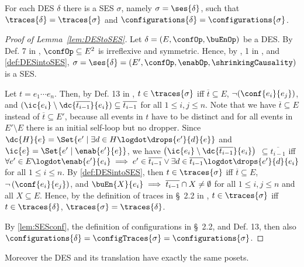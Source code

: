 \documentclass[runningheads,a4paper]{llncs}
\begin{document}
\begin{lemma}
	\label{lem:DEStoSES}
	For each DES $ \delta $ there is a SES $ \sigma $, namely $ \sigma = \ses{\delta} $, such that $ \traces{\delta} = \traces{\sigma} $ and $ \configurations{\delta} = \configurations{\sigma} $.
\end{lemma}

\begin{proof}[Proof of Lemma~\ref{lem:DEStoSES}]
	Let $ \delta = \left( E, \confOp, \buEnOp \right) $ be a DES. By Def. 7 in \cite{dynamicCausality15}, $ \confOp \subseteq E^2 $ is irreflexive and symmetric. Hence, by , 1 in \cite{dynamicCausality15}, and \ref{def:DESintoSES}, $ \sigma = \ses{\delta} = \left( E', \confOp, \enabOp, \shrinkingCausality \right) $ is a SES.	
	
	Let $ t = e_1 \cdots e_n $.	Then, by Def. 13 in \cite{dynamicCausality15}, $ t \in \traces{\sigma} $ iff $ \overline{t} \subseteq E $, $ \neg ( \conf{e_i}{e_j} ) $, and $ ( \ic{e_i} \setminus \dc{\overline{t_{i - 1}}}{e_i} ) \subseteq \overline{t_{i - 1}} $ for all $ 1 \leq i, j \leq n $. Note that we have $ \overline{t} \subseteq E $ instead of $ \overline{t} \subseteq E' $, because all events in $ t $ have to be distinct and for all events in $ E' \setminus E $ there is an initial self-loop but no dropper.
	Since $ \dc{H}{e} = \Set{ e' \mid \exists d \in H \logdot \drops{e'}{d}{e} } $ and $ \ic{e} = \Set{ e' \mid \enab{e'}{e} } $, we have $ \left( \ic{e_i} \setminus \dc{\overline{t_{i - 1}}}{e_i} \right)$ $ \subseteq \overline{t_{i - 1}} $ iff $ \forall e' \in E \logdot \enab{e'}{e_i} \implies e' \in \overline{t_{i - 1}} \lor \exists d \in \overline{t_{i - 1}} \logdot \drops{e'}{d}{e_i} $ for all $ 1 \leq i \leq n $.
	By \ref{def:DESintoSES}, then $ t \in \traces{\sigma} $ iff $ \overline{t} \subseteq E $, $ \neg \left( \conf{e_i}{e_j} \right) $, and $ \buEn{X}{e_i} \implies \overline{t_{i - 1}} \cap X \neq \emptyset $ for all $ 1 \leq i, j \leq n $ and all $ X \subseteq E $.
	Hence, by the definition of traces in \S~2.2 in \cite{dynamicCausality15}, $ t \in
	\traces{\sigma} $ iff $ t \in \traces{\delta} $, \ie $ \traces{\sigma} = \traces{\delta} $.
	
	By \lem\ref{lem:SESconf}, the definition of
	configurations in \S~2.2, and Def. 13, then
	also $ \configurations{\delta} = \configTraces{\sigma} = \configurations{\sigma} $.
\end{proof}

Moreover the DES and its translation have exactly the same posets.
\end{document}
